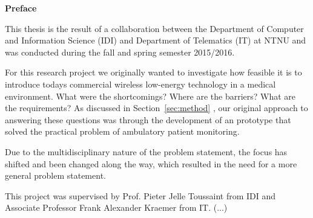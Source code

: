 	\noindent \textbf{Preface}
  \newline
  	
\noindent  
This thesis is the result of a collaboration between the Department of Computer and Information Science (IDI) and Department of Telematics (IT) at NTNU and was conducted during the fall and spring semester 2015/2016.

For this research project we originally wanted to investigate how feasible it is to introduce todays commercial wireless low-energy technology in a medical environment. What were the shortcomings? Where are the barriers? What are the requirements? As discussed in Section~\ref{sec:method} , our original approach to answering these questions was through the development of an prototype that solved the practical problem of ambulatory patient monitoring.

Due to the multidisciplinary nature of the problem statement, the focus has shifted and been changed along the way, which resulted in the need for a more general problem statement.

This project was supervised by Prof. Pieter Jelle Toussaint from IDI and Associate Professor Frank Alexander Kraemer from IT.
  (...)